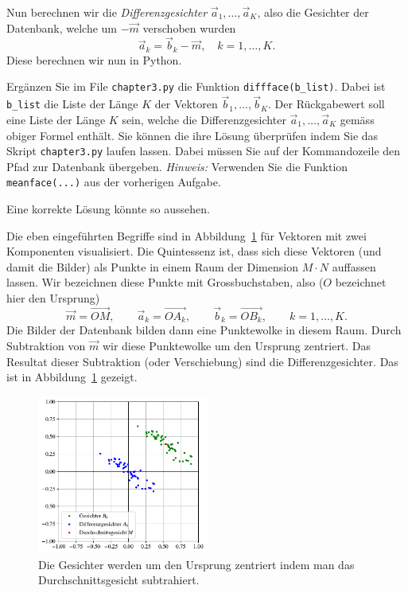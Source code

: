 Nun berechnen wir die \textit{Differenzgesichter} $\vec a_1,\ldots,\vec a_K$, also die Gesichter der Datenbank, welche um $-\vec{m}$ verschoben wurden
\begin{equation*}
	\vec a_k=\vec b_k-\vec m,\quad k=1,\ldots,K.
\end{equation*}
Diese berechnen wir nun in Python.
\begin{aufgabe} \label{aufg:diffface}
	Ergänzen Sie im File \texttt{chapter3.py} die Funktion \texttt{diffface(b\_list)}.
	Dabei ist \texttt{b\_list} die Liste der Länge $K$ der Vektoren $\vec b_1,\ldots,\vec b_K$.
	Der Rückgabewert soll eine Liste der Länge $K$ sein, welche die Differenzgesichter $\vec a_1,\ldots,\vec a_K$ gemäss obiger Formel enthält.
	Sie können die ihre Lösung überprüfen indem Sie das Skript \texttt{chapter3.py} laufen lassen.
	Dabei müssen Sie auf der Kommandozeile den Pfad zur Datenbank übergeben.
	\textit{Hinweis:} Verwenden Sie die Funktion \texttt{meanface(...)} aus der vorherigen Aufgabe.
\end{aufgabe}
\begin{losung}
	Eine korrekte Lösung könnte so aussehen.

\end{losung}
Die eben eingeführten Begriffe sind in Abbildung~\ref{fig:meandiff} für Vektoren mit zwei Komponenten visualisiert.
Die Quintessenz ist, dass sich diese Vektoren (und damit die Bilder) als Punkte in einem Raum der Dimension $M\cdot N$ auffassen lassen.
Wir bezeichnen diese Punkte mit Grossbuchstaben, also ($O$ bezeichnet hier den Ursprung)
\begin{equation*}
	\vec{m}=\overrightarrow{OM},\qquad
	\vec{a}_k=\overrightarrow{OA_k},\qquad
	\vec{b}_k=\overrightarrow{OB_k},\qquad
	k=1,\ldots,K.
\end{equation*}
Die Bilder der Datenbank bilden dann eine \glqq{}Punktewolke\grqq{} in diesem Raum.
Durch Subtraktion von $\vec m$ wir diese Punktewolke um den Ursprung zentriert.
Das Resultat dieser Subtraktion (oder Verschiebung) sind die Differenzgesichter.
Das ist in Abbildung~\ref{fig:meandiff} gezeigt.
\begin{figure}[ht]
	\centering
	\includegraphics[width=0.5\textwidth]{images/facespace/meandiff}
	\caption{Die Gesichter werden um den Ursprung zentriert indem man das Durchschnittsgesicht subtrahiert.}
	\label{fig:meandiff}
\end{figure}
